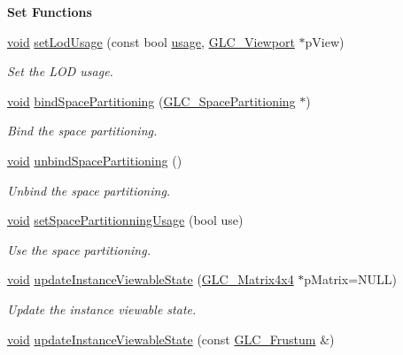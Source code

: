 \begin{Indent}{\bf Set Functions}
\begin{DoxyCompactItemize}
\hyperlink{group___u_a_v_objects_plugin_ga444cf2ff3f0ecbe028adce838d373f5c}{void} \hyperlink{class_g_l_c__3_d_view_collection_a470395e7eb5d3d6b123c210119289c3e}{set\-Lod\-Usage} (const bool \hyperlink{glext_8h_ae759ed0394ed5353d8bef2fb755305da}{usage}, \hyperlink{class_g_l_c___viewport}{G\-L\-C\-\_\-\-Viewport} $\ast$p\-View)
\begin{DoxyCompactList}\small\item\em Set the L\-O\-D usage. \end{DoxyCompactList}\item 
\hyperlink{group___u_a_v_objects_plugin_ga444cf2ff3f0ecbe028adce838d373f5c}{void} \hyperlink{class_g_l_c__3_d_view_collection_a9b61e3ece5af514c8c65de792b7cd7c4}{bind\-Space\-Partitioning} (\hyperlink{class_g_l_c___space_partitioning}{G\-L\-C\-\_\-\-Space\-Partitioning} $\ast$)
\begin{DoxyCompactList}\small\item\em Bind the space partitioning. \end{DoxyCompactList}\item 
\hyperlink{group___u_a_v_objects_plugin_ga444cf2ff3f0ecbe028adce838d373f5c}{void} \hyperlink{class_g_l_c__3_d_view_collection_a367543e09bfba544d1afa94e15f59cf8}{unbind\-Space\-Partitioning} ()
\begin{DoxyCompactList}\small\item\em Unbind the space partitioning. \end{DoxyCompactList}\item 
\hyperlink{group___u_a_v_objects_plugin_ga444cf2ff3f0ecbe028adce838d373f5c}{void} \hyperlink{class_g_l_c__3_d_view_collection_ae09298a67fd3cfe060f47468d6db6dae}{set\-Space\-Partitionning\-Usage} (bool use)
\begin{DoxyCompactList}\small\item\em Use the space partitioning. \end{DoxyCompactList}\item 
\hyperlink{group___u_a_v_objects_plugin_ga444cf2ff3f0ecbe028adce838d373f5c}{void} \hyperlink{class_g_l_c__3_d_view_collection_ada30eead051fe81ec9aaef5496467345}{update\-Instance\-Viewable\-State} (\hyperlink{class_g_l_c___matrix4x4}{G\-L\-C\-\_\-\-Matrix4x4} $\ast$p\-Matrix=N\-U\-L\-L)
\begin{DoxyCompactList}\small\item\em Update the instance viewable state. \end{DoxyCompactList}\item 
\hyperlink{group___u_a_v_objects_plugin_ga444cf2ff3f0ecbe028adce838d373f5c}{void} \hyperlink{class_g_l_c__3_d_view_collection_a20efeb420a876656dd1d178006e0e581}{update\-Instance\-Viewable\-State} (const \hyperlink{class_g_l_c___frustum}{G\-L\-C\-\_\-\-Frustum} \&)

\end{DoxyCompactItemize}
\end{Indent}
